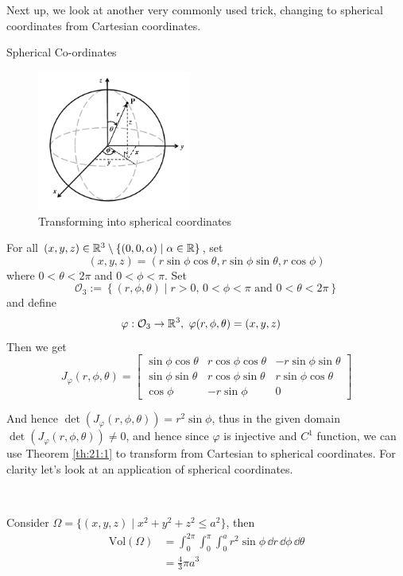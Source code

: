 \documentclass[../Analysis-3.tex]{subfiles}
\begin{document}
Next up, we look at another very commonly used trick, changing to spherical coordinates from Cartesian coordinates.

\begin{Eg}{Spherical Co-ordinates}{}
  \begin{figure}
    \centering
    \includegraphics[width=0.45\textwidth]{../figures/lec21.2.png}
    \caption{Transforming into spherical coordinates}
    \label{fig2:21}
  \end{figure}
  For all $(x,y,z) \in \mathbb{R}^3 \setminus \{ (0,0,\alpha) \mid \alpha \in \mathbb{R} \}$, set
  \[
    (x,y,z) = (r\sin\phi\cos\theta, r\sin\phi\sin\theta, r \cos\phi)
  \]
  where $0 < \theta < 2\pi$ and $0 < \phi < \pi$. Set
  \[
    \mathcal{O}_3 := \left\{ (r,\phi,\theta) \mid r >0, \, 0 < \phi < \pi \mbox{ and } 0 < \theta < 2\pi \right\}
  \]
  and define
  \begin{align*}
    \varphi : \mathcal{O}_3 & \to \mathbb{R}^3, \ \varphi(r,\phi,\theta) = (x,y,z)
  \end{align*}
  Then we get
  \[
    J_{\varphi}(r,\phi,\theta) = \begin{bmatrix}
      \sin\phi\cos\theta & r\cos\phi\cos\theta & -r\sin\phi\sin\theta \\
      \sin\phi\sin\theta & r\cos\phi\sin\theta & r\sin\phi\cos\theta  \\
      \cos\phi           & -r\sin\phi          & 0
    \end{bmatrix}
  \]


  And hence $\det(J_{\varphi}(r,\phi,\theta)) = r^2 \sin \phi$, thus in the given domain $\det(J_{\varphi}(r,\phi,\theta)) \neq 0$, and hence since $\varphi$ is injective and $C^1$ function, we can use Theorem \ref{th:21:1} to transform from Cartesian to spherical coordinates. For clarity let's look at an application of spherical coordinates.

  \

  Consider $\Omega = \{ (x,y,z) \mid x^2 + y^2 + z^2 \leq a^2 \}$, then
  \begin{align*}
    \mathrm{Vol}(\Omega) & = \int_0^{2\pi}\int_0^{\pi} \int_0^a r^2 \sin \phi \, \dd r \, \dd \phi \, \dd \theta \\
                         & = \frac{4}{3}\pi a^3
  \end{align*}
\end{Eg}
\end{document}
